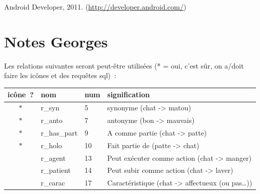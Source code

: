 \documentclass[a4paper,11pt,french]{article}
\begin{document}
Android Developer, 2011. (\url{http://developer.android.com/})




\section{Notes Georges}
Les relations suivantes seront peut-être utilisées (* = oui, c'est sûr, on a/doit faire les icônes et des requêtes sql)~:

\begin{tabular}{|c|l|l|l|}
\hline
icône~? & nom & num & signification \\
\hline
$*$ & r\_syn       & 5  & synonyme (chat -> matou) \\
$*$ & r\_anto      & 7  & antonyme (bon -> mauvais) \\
$*$ & r\_has\_part & 9  & A comme partie (chat -> patte) \\
$*$ & r\_holo      & 10 & Fait partie de (patte -> chat) \\
    & r\_agent     & 13 & Peut exécuter comme action (chat -> manger) \\
    & r\_patient   & 14 & Peut subir comme action (chat -> laver) \\
    & r\_carac     & 17 & Caractéristique (chat -> affectueux (ou pas…)) \\
\hline
\end{tabular}

\newpage

\appendix
\end{document}
